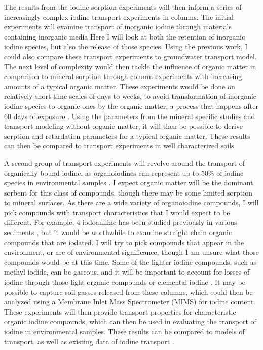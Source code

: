 \documentclass[twoside,12pt,titlepage]{article}
\begin{document}
The results from the iodine sorption experiments will then inform a series of increasingly complex iodine transport experiments in columns. The initial experiments will examine transport of inorganic iodine through materials containing inorganic media Here I will look at both the retention of inorganic iodine species, but also the release of those species. Using the previous work, I could also compare these transport experiments to groundwater transport model. The next level of complexity would then tackle the influence of organic matter in comparison to mineral sorption through column experiments with increasing amounts of a typical organic matter. These experiments would be done on relatively short time scales of days to weeks, to avoid transformation of inorganic iodine species to organic ones by the organic matter, a process that happens after 60 days of exposure \cite{Yamaguchi2008}. Using the parameters from the mineral specific studies and transport modeling without organic matter, it will then be possible to derive sorption and retardation parameters for a typical organic matter. These results can then be compared to transport experiments in well characterized soils.
\par A second group of transport experiments will revolve around the transport of organically bound iodine, as organoiodines can represent up to $50\%$ of iodine species in environmental samples \cite{Hou2009}. I expect organic matter will be the dominant sorbent for this class of compounds, though there may be some limited sorption to mineral surfaces. As there are a wide variety of organoiodine compounds, I will pick compounds with transport characteristics that I would expect to be different. For example, 4-iodoaniline has been studied previously in various sediments \cite{Hu2005}, but it would be worthwhile to examine straight chain organic compounds that are iodated. I will try to pick compounds that appear in the environment, or are of environmental significance, though I am unsure what those compounds would be at this time. Some of the lighter iodine compounds, such as methyl iodide, can be gaseous, and it will be important to account for losses of iodine through those light organic compounds or elemental iodine \cite{Gilfedder2010}. It may be possible to capture soil gasses released from these columns, which could then be analyzed using a Membrane Inlet Mass Spectrometer (MIMS) for iodine content. These experiments will then provide transport properties for characteristic organic iodine compounds, which can then be used in evaluating the transport of iodine in environmental samples. These results can be compared to models of transport, as well as existing data of iodine transport \cite{Hu2005}.
\end{document}
